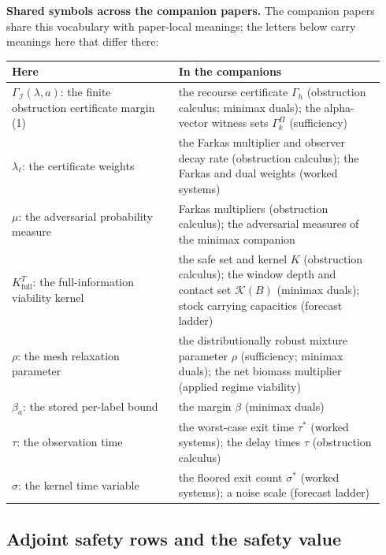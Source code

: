 \documentclass[10pt,twocolumn]{article}
\theoremstyle{plain}
\theoremstyle{definition}
\theoremstyle{remark}
\begin{document}
\medskip
\noindent\textbf{Shared symbols across the companion papers.} The
companion papers share this vocabulary with paper-local meanings; the
letters below carry meanings here that differ there:
\begin{center}\small
\begin{tabular}{@{}p{0.42\linewidth}p{0.52\linewidth}@{}}
\toprule
\textbf{Here} & \textbf{In the companions} \\
\midrule
\(\Gamma_{\mathcal{I}}(\lambda, a)\): the finite obstruction certificate margin (1) & the recourse certificate \(\Gamma_{h}\) (obstruction calculus; minimax duals); the alpha-vector witness sets \(\Gamma^{\Pi}_{k}\) (sufficiency) \\
\(\lambda_{\ell}\): the certificate weights & the Farkas multiplier and observer decay rate (obstruction calculus); the Farkas and dual weights (worked systems) \\
\(\mu\): the adversarial probability measure & Farkas multipliers (obstruction calculus); the adversarial measures of the minimax companion \\
\(K^{T}_{\mathrm{full}}\): the full-information viability kernel & the safe set and kernel \(K\) (obstruction calculus); the window depth and contact set \(\mathcal{K}(B)\) (minimax duals); stock carrying capacities (forecast ladder) \\
\(\rho\): the mesh relaxation parameter & the distributionally robust mixture parameter \(\rho\) (sufficiency; minimax duals); the net biomass multiplier (applied regime viability) \\
\(\beta_{a}\): the stored per-label bound & the margin \(\beta\) (minimax duals) \\
\(\tau\): the observation time & the worst-case exit time \(\tau^{*}\) (worked systems); the delay times \(\tau\) (obstruction calculus) \\
\(\sigma\): the kernel time variable & the floored exit count \(\sigma^{*}\) (worked systems); a noise scale (forecast ladder) \\
\bottomrule
\end{tabular}
\end{center}


\subsection{Adjoint safety rows and the safety value}\label{lp-rows}
\end{document}
